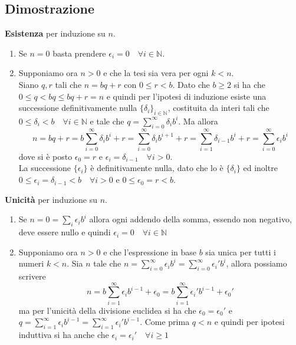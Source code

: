 \documentclass[a4paper,12pt]{article}
\begin{document}
\subsection*{Dimostrazione}
\textbf{Esistenza} per induzione su $ n $.
\begin{enumerate}
	\item Se $ n = 0 $ basta prendere $ \epsilon_{i} = 0 \quad \forall i \in \mathbb{N} $.
	\item Supponiamo ora $ n > 0 $ e che la tesi sia vera per ogni $ k < n $.\\
	Siano $ q, r $ tali che $ n = bq + r $ con $ 0 \leq r < b $. Dato che $ b \geq 2 $ si ha che $ 0 \leq q < bq \leq bq +r = n $ e quindi per l'ipotesi di induzione esiste una successione definitivamente nulla $ \{\delta_{i}\}_{i \in \mathbb{N}} $, costituita da interi tali che $ 0 \leq \delta_{i} < b \quad \forall i \in \mathbb{N} $ e tale che $ q = \sum_{i = 0}^{\infty} \delta_{i}b^{i} $. Ma allora
	\[ n = bq + r = b \sum_{i = 0}^\infty \delta_{i}b^i + r = \sum_{i = 0}^\infty \delta_{i}b^{i+1} + r = \sum_{i = 1}^\infty \delta_{i-1}b^i + r = \sum_{i = 0}^\infty \epsilon_{i}b^i \]
	dove si è posto $ \epsilon_{0} = r $ e $ \epsilon_{i} = \delta_{i-1} \quad \forall i > 0 $.\\
	La successione $ \{ \epsilon_{i} \} $ è definitivamente nulla, dato che lo è $ \{\delta_{i}\} $ ed inoltre $ 0 \leq \epsilon_{i} = \delta_{i-1} < b \quad \forall i > 0 $ e $ 0 \leq \epsilon_{0} = r < b $.
\end{enumerate}
\textbf{Unicità} per induzione su $ n $.
\begin{enumerate}
	\item Se $ n = 0 = \sum_i \epsilon_ib^i $ allora ogni addendo della somma, essendo non negativo, deve essere nullo e quindi $ \epsilon_{i} = 0 \quad \forall i \in \mathbb{N} $
	\item Supponiamo ora $ n > 0 $ e che l'espressione in base $ b $ sia unica per tutti i numeri $ k < n $. Sia $ n $ tale che $ n = \sum_{i = 0}^{\infty} \epsilon_ib^i = \sum_{i = 0}^{\infty} \epsilon_i'b^i $, allora possiamo scrivere
	\[ n = b\sum_{i = 1}^\infty \epsilon_ib^{i-1} + \epsilon_{0} = b\sum_{i = 1}^\infty \epsilon_i'b^{i-1} + \epsilon_{0}' \]
	ma per l'unicità della divisione euclidea si ha che $ \epsilon_{0} = \epsilon_{0}' $ e $ q = \sum_{i = 1}^\infty \epsilon_ib^{i-1} = \sum_{i = 1}^\infty \epsilon_i'b^{i-1} $. Come prima $ q < n $ e quindi per ipotesi induttiva si ha anche che $ \epsilon_i = \epsilon_i' \quad \forall i \geq 1 $
\end{enumerate}
\end{document}

